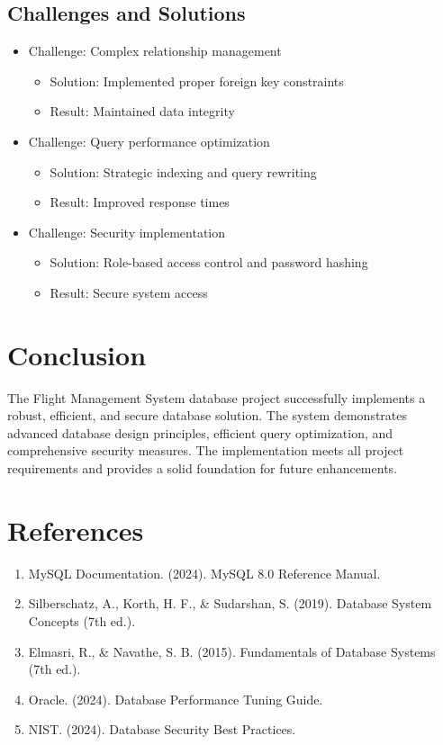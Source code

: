 \documentclass[a4paper,12pt]{article}
\begin{document}
\subsection{Challenges and Solutions}
\begin{itemize}
    \item Challenge: Complex relationship management
    \begin{itemize}
        \item Solution: Implemented proper foreign key constraints
        \item Result: Maintained data integrity
    \end{itemize}
    \item Challenge: Query performance optimization
    \begin{itemize}
        \item Solution: Strategic indexing and query rewriting
        \item Result: Improved response times
    \end{itemize}
    \item Challenge: Security implementation
    \begin{itemize}
        \item Solution: Role-based access control and password hashing
        \item Result: Secure system access
    \end{itemize}
\end{itemize}

\section{Conclusion}
The Flight Management System database project successfully implements a robust, efficient, and secure database solution. The system demonstrates advanced database design principles, efficient query optimization, and comprehensive security measures. The implementation meets all project requirements and provides a solid foundation for future enhancements.

\section{References}
\begin{enumerate}
    \item MySQL Documentation. (2024). MySQL 8.0 Reference Manual.
    \item Silberschatz, A., Korth, H. F., \& Sudarshan, S. (2019). Database System Concepts (7th ed.).
    \item Elmasri, R., \& Navathe, S. B. (2015). Fundamentals of Database Systems (7th ed.).
    \item Oracle. (2024). Database Performance Tuning Guide.
    \item NIST. (2024). Database Security Best Practices.
\end{enumerate}
\end{document}
